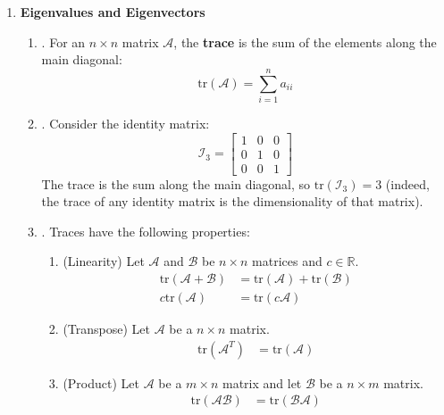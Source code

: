 \documentclass[12pt]{article}
\begin{document}
\begin{enumerate}
\begin{comment}
\end{comment}



\item\textbf{Eigenvalues and Eigenvectors}
	\begin{enumerate}
	\item\underline{}.
		For an $n\times n$ matrix $\mathcal{A}$, the \textbf{trace} is the sum of the elements along the main
		diagonal:
			\[\text{tr}(\mathcal{A})=\sum_{i=1}^na_{ii}\]

	\item\underline{}.
		Consider the identity matrix:
			\[\mathcal{I}_{3}=\begin{bmatrix}1&0&0\\0&1&0\\0&0&1\end{bmatrix}\]
		The trace is the sum along the main diagonal, so $\text{tr}(\mathcal{I}_3)=3$ (indeed, the trace of any
		identity matrix is the dimensionality of that matrix).

\newpage 

	\item\underline{}.
		Traces have the following properties:
		\begin{enumerate}
		\item (Linearity) Let $\mathcal{A}$ and $\mathcal{B}$ be $n\times n$ matrices and $c \in \mathbb{R}$. 
			\begin{align*}
				\text{tr}(\mathcal{A+B}) & =\text{tr}(\mathcal{A})+\text{tr}(\mathcal{B})	\\
				c\text{tr}(\mathcal{A}) & =\text{tr}(c\mathcal{A})
			\end{align*}
		\item (Transpose) Let $\mathcal{A}$ be a $n\times n$ matrix. 
			\begin{align*}
				\text{tr}(\mathcal{A}^T)&=\text{tr}(\mathcal{A})
			\end{align*}
		\item (Product) Let $\mathcal{A}$ be a $m\times n$ matrix and let $\mathcal{B}$ be a $n \times m$ matrix. 
			\begin{align*}
			\text{tr}(\mathcal{AB})&=\text{tr}(\mathcal{BA})
			\end{align*}
		\end{enumerate}
	

\end{enumerate}
\end{enumerate}
\end{document}

